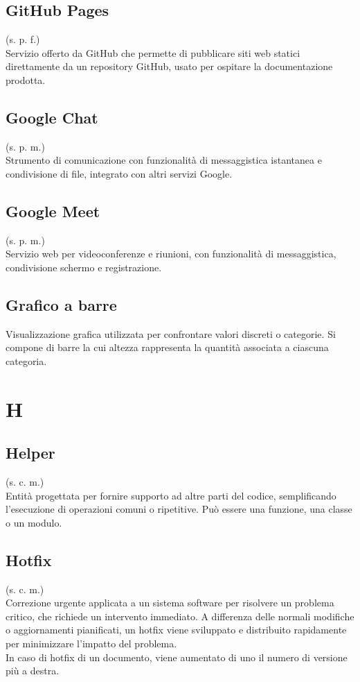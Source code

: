     \subsection{GitHub Pages}
    \label{GitHub Pages}
    (s. p. f.)\\
    Servizio offerto da GitHub che permette di pubblicare siti web statici direttamente da un repository GitHub,
    usato per ospitare la documentazione prodotta.
    \subsection{Google Chat}
    (s. p. m.)\\
    Strumento di comunicazione con funzionalità di messaggistica
    istantanea e condivisione di file, integrato con altri servizi Google.
    \subsection{Google Meet}    
    (s. p. m.)\\
    Servizio web per videoconferenze e riunioni, con funzionalità di messaggistica,
    condivisione schermo e registrazione.
    \subsection{Grafico a barre}
    Visualizzazione grafica utilizzata per confrontare valori discreti o categorie. 
    Si compone di barre la cui altezza rappresenta la quantità associata a ciascuna categoria.
\pagebreak
\section{H}
    \subsection{Helper}
    (s. c. m.)\\
    Entità progettata per fornire supporto ad altre parti del codice, 
    semplificando l'esecuzione di operazioni comuni o ripetitive.
    Può essere una funzione, una classe o un modulo.
    \subsection{Hotfix}
    (s. c. m.)\\
    Correzione urgente applicata a un sistema software per risolvere un problema critico, 
    che richiede un intervento immediato. A differenza delle normali modifiche o aggiornamenti pianificati, 
    un hotfix viene sviluppato e distribuito rapidamente per minimizzare l'impatto del problema.\\
    In caso di hotfix di un documento, viene aumentato di uno il numero di versione più a destra.
